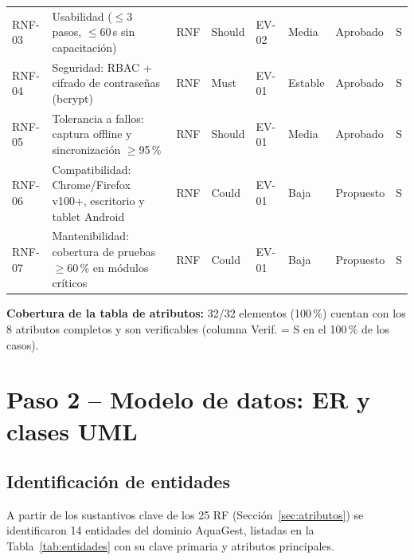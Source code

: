 \documentclass[11pt,a4paper]{report}
\begin{document}
{\begin{longtable}{L{1.1cm}L{4.6cm}L{1.0cm}L{1.3cm}L{1.3cm}L{1.3cm}L{1.4cm}L{1.1cm}}
RNF-03 & Usabilidad ($\leq$3 pasos, $\leq$60\,s sin capacitaci\'on) & RNF & Should & EV-02 & Media & Aprobado & S \\
RNF-04 & Seguridad: RBAC + cifrado de contrase\~nas (bcrypt) & RNF & Must & EV-01 & Estable & Aprobado & S \\
RNF-05 & Tolerancia a fallos: captura offline y sincronizaci\'on $\geq$95\,\% & RNF & Should & EV-01 & Media & Aprobado & S \\
RNF-06 & Compatibilidad: Chrome/Firefox v100+, escritorio y tablet Android & RNF & Could & EV-01 & Baja & Propuesto & S \\
RNF-07 & Mantenibilidad: cobertura de pruebas $\geq$60\,\% en m\'odulos cr\'iticos & RNF & Could & EV-01 & Baja & Propuesto & S \\
\end{longtable}
}

\noindent \textbf{Cobertura de la tabla de atributos:} 32/32 elementos (100\,\%) cuentan con los 8 atributos completos y son verificables (columna Verif. = S en el 100\,\% de los casos).

\chapter{Paso 2 -- Modelo de datos: ER y clases UML}
\label{sec:paso2}

\section{Identificaci\'on de entidades}

A partir de los sustantivos clave de los 25 RF (Secci\'on~\ref{sec:atributos}) se identificaron 14 entidades del dominio AquaGest, listadas en la Tabla~\ref{tab:entidades} con su clave primaria y atributos principales.
\end{document}
